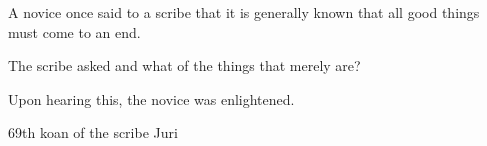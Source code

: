 A novice once said to a scribe that it is generally known that all good
things must come to an end.

The scribe asked and what of the things that merely are?

Upon hearing this, the novice was enlightened.


\hfill\emdashStart 69th koan of the scribe Juri

